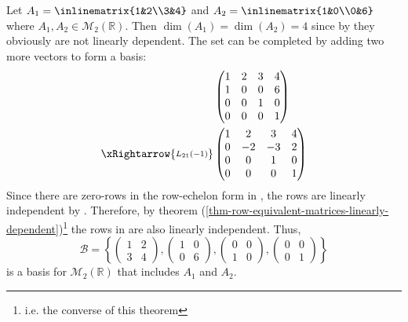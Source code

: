 \begin{exm}
	Let $A_1=\inlinematrix{1&2\\3&4}$ and $A_2=\inlinematrix{1&0\\0&6}$ where
	$A_1,A_2\in\mathcal{M}_2(\mathbb{R})$. Then $\dim(A_1)=\dim(A_2)=4$ since
	by  they
	obviously are not linearly dependent. The set can be completed by adding
	two more vectors to form a basis:
	\begin{align}
		 & \begin{pmatrix}
			1 & 2 & 3 & 4 \\
			1 & 0 & 0 & 6 \\
			0 & 0 & 1 & 0 \\
			0 & 0 & 0 & 1
		\end{pmatrix}\label{exm-row-echolon:1} \\
		\xRightarrow{\substack{L_{21}(-1)}}
		 & \begin{pmatrix}
			1 & 2  & 3  & 4 \\
			0 & -2 & -3 & 2 \\
			0 & 0  & 1  & 0 \\
			0 & 0  & 0  & 1
		\end{pmatrix}\label{exm-row-echolon:2}
	\end{align}
	Since there are zero-rows in the row-echelon form in ,
	the rows are linearly independent by
	. Therefore,
	by theorem (\ref{thm-row-equivalent-matrices-linearly-dependent})\footnote{
		i.e. the converse of this theorem} the rows in 
	are also linearly independent. Thus,
	\begin{equation*}
		\mathcal{B}=\left\{
		\begin{pmatrix}
			1 & 2 \\
			3 & 4
		\end{pmatrix},
		\begin{pmatrix}
			1 & 0 \\
			0 & 6
		\end{pmatrix},
		\begin{pmatrix}
			0 & 0 \\
			1 & 0
		\end{pmatrix},
		\begin{pmatrix}
			0 & 0 \\
			0 & 1
		\end{pmatrix}
		\right\}
	\end{equation*}
	is a basis for $\mathcal{M}_2(\mathbb{R})$ that includes $A_1$ and $A_2$.
\end{exm}

